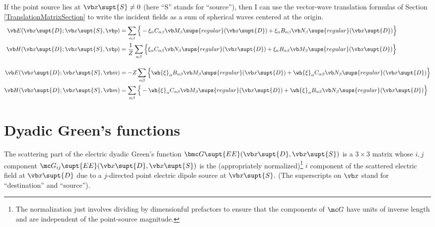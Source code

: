 \documentclass[letterpaper]{article}
\begin{document}
If the point source lies at $\vb x\supt{S}\ne 0$ (here ``S''
stands for ``source''), then I can use the vector-wave
translation formulas of Section \ref{TranslationMatrixSection}
to write the incident fields as a sum
of spherical waves centered at the origin.
\begin{subequations}
\begin{align}
 \vb E(\vb x\supt{D}; \vb x\supt{S}, \vb p)
   &= \sum_{\alpha\beta}
      \Big\{
       -\xi_\alpha C_{\alpha\beta}  \vb M_\beta\sups{regular}(\vb x\supt{D})
       +\xi_\alpha B_{\alpha\beta} \vb N_\beta\sups{regular}(\vb x\supt{D})
      \Big\}
\\
 \vb H(\vb x\supt{D}; \vb x\supt{S}, \vb p)
   &= \frac{1}{Z}\sum_{\alpha\beta}
                    \Big\{
         \xi_\alpha C_{\alpha\beta} \vb N_\beta\sups{regular}(\vb x\supt{D})
       + \xi_\alpha B_{\alpha\beta} \vb M_\beta\sups{regular}(\vb x\supt{D})
                    \Big\}
\\[10pt]
 \vb E(\vb x\supt{D}; \vb x\supt{S}, \vb m)
   &=-Z \sum_{\alpha\beta} \Big\{
        \wh{\xi}_\alpha B_{\alpha\beta} \vb M_\beta\sups{regular}(\vb x\supt{D})
       +\wh{\xi}_\alpha C_{\alpha\beta} \vb N_\beta\sups{regular}(\vb x\supt{D})
                    \Big\}
\\
 \vb H(\vb x\supt{D}; \vb x\supt{S}, \vb m)
   &= \sum_{\alpha\beta} \Big\{
       -\wh{\xi}_\alpha C_{\alpha\beta} \vb M_\beta\sups{regular}(\vb x\supt{D})
       +\wh{\xi}_\alpha B_{\alpha\beta} \vb N_\beta\sups{regular}(\vb x\supt{D})
                    \Big\}
\end{align}
\label{TranslatedPSFields}
\end{subequations}

\newpage
\section{Dyadic Green's functions}
\label{DGFSection}

The scattering part of the electric dyadic Green's function
$\bmc G\supt{EE}(\vb x\supt{D}, \vb x\supt{S})$ is a $3\times 3$ matrix
whose $i,j$ component
$\mc G_{ij}\supt{EE}(\vb x\supt{D}, \vb x\supt{S})$
is the (appropriately normalized)\footnote{
The normalization just involves dividing by dimensionful prefactors
to ensure that the components of $\mc G$ have units of inverse
length and are independent of the point-source magnitude.}
$i$ component
of the scattered electric field at $\vb x\supt{D}$ due to a $j$-directed
point electric dipole source at $\vb x\supt{S}.$
(The superscripts on $\vb x$ stand for ``destination'' and ``source'').
\end{document}
